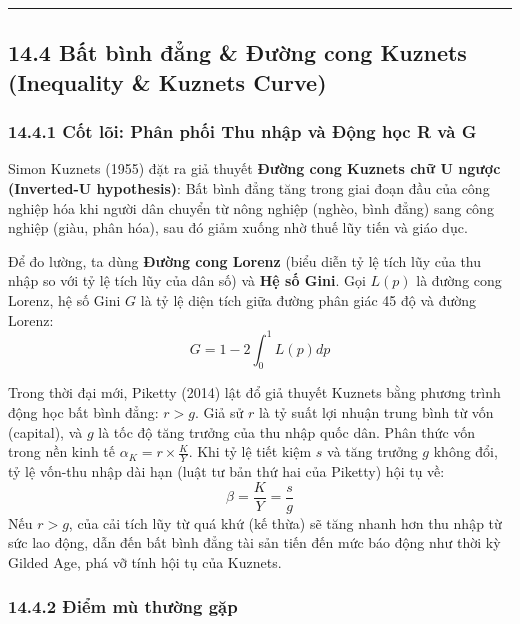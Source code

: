 \documentclass[
]{article}
\begin{document}
\begin{center}\rule{0.5\linewidth}{0.5pt}\end{center}

\subsection{14.4 Bất bình đẳng \& Đường cong Kuznets (Inequality \&
Kuznets
Curve)}\label{bux1ea5t-buxecnh-ux111ux1eb3ng-ux111ux1b0ux1eddng-cong-kuznets-inequality-kuznets-curve}

\subsubsection{14.4.1 Cốt lõi: Phân phối Thu nhập và Động học R và
G}\label{cux1ed1t-luxf5i-phuxe2n-phux1ed1i-thu-nhux1eadp-vuxe0-ux111ux1ed9ng-hux1ecdc-r-vuxe0-g}

Simon Kuznets (1955) đặt ra giả thuyết \textbf{Đường cong Kuznets chữ U
ngược (Inverted-U hypothesis)}: Bất bình đẳng tăng trong giai đoạn đầu
của công nghiệp hóa khi người dân chuyển từ nông nghiệp (nghèo, bình
đẳng) sang công nghiệp (giàu, phân hóa), sau đó giảm xuống nhờ thuế lũy
tiến và giáo dục.

Để đo lường, ta dùng \textbf{Đường cong Lorenz} (biểu diễn tỷ lệ tích
lũy của thu nhập so với tỷ lệ tích lũy của dân số) và \textbf{Hệ số
Gini}. Gọi \(L(p)\) là đường cong Lorenz, hệ số Gini \(G\) là tỷ lệ diện
tích giữa đường phân giác 45 độ và đường Lorenz:
\[ G = 1 - 2\int_{0}^{1} L(p) dp \]

Trong thời đại mới, Piketty (2014) lật đổ giả thuyết Kuznets bằng phương
trình động học bất bình đẳng: \textbf{\(r > g\)}. Giả sử \(r\) là tỷ
suất lợi nhuận trung bình từ vốn (capital), và \(g\) là tốc độ tăng
trưởng của thu nhập quốc dân. Phân thức vốn trong nền kinh tế
\(\alpha_K = r \times \frac{K}{Y}\). Khi tỷ lệ tiết kiệm \(s\) và tăng
trưởng \(g\) không đổi, tỷ lệ vốn-thu nhập dài hạn (luật tư bản thứ hai
của Piketty) hội tụ về: \[ \beta = \frac{K}{Y} = \frac{s}{g} \] Nếu
\(r > g\), của cải tích lũy từ quá khứ (kế thừa) sẽ tăng nhanh hơn thu
nhập từ sức lao động, dẫn đến bất bình đẳng tài sản tiến đến mức báo
động như thời kỳ Gilded Age, phá vỡ tính hội tụ của Kuznets.

\subsubsection{14.4.2 Điểm mù thường
gặp}\label{ux111iux1ec3m-muxf9-thux1b0ux1eddng-gux1eb7p-9}
\end{document}
